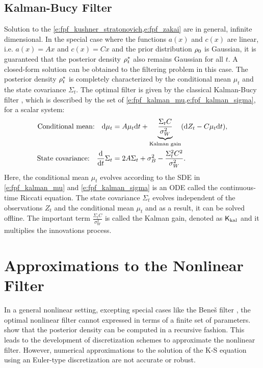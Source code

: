 \subsection{Kalman-Bucy Filter}
Solution to the \cref{e:fpf_kushner_stratonovich,e:fpf_zakai} are in general, infinite dimensional. In the special case where the functions $a(x)$ and $c(x)$ are linear, i.e. $a(x) = Ax$ and $c(x) = Cx$ and the prior distribution $\rho_0$ is Gaussian, it is guaranteed that the posterior density $\rho^*_t$ also remains Gaussian for all $t$. A closed-form solution can be obtained to the filtering problem in this case. The posterior density $\rho^*_t$ is completely characterized by the conditional mean $\mu_t$ and the state covariance $\Sigma_t$. The optimal filter is given by the classical Kalman-Bucy filter \cite{kal64}, which is described by the set of \cref{e:fpf_kalman_mu,e:fpf_kalman_sigma}, for a scalar system:
\begin{align}
\text{Conditional mean:} \quad \ud \mu_t & = A \mu_t \ud t + \underbrace{\frac{\Sigma_t C}{\sigma^2_W}}_{\text{Kalman gain}} ( \ud Z_t - C \mu_t \ud t), 
\label{e:fpf_kalman_mu} \\
\text{State covariance:}  \quad  \frac{\ud}{\ud t} \Sigma_t &= 2 A \Sigma_t + \sigma^2_B - \frac{\Sigma^2_t C^2}{\sigma^2_W}. 
\label{e:fpf_kalman_sigma}
\end{align}
Here, the conditional mean $\mu_t$ evolves according to the SDE in \eqref{e:fpf_kalman_mu} and \eqref{e:fpf_kalman_sigma} is an ODE called the continuous-time Riccati equation. The state covariance $\Sigma_t$ evolves independent of the observations $Z_t$ and the conditional mean $\mu_t$ and as a result, it can be solved offline.  
The important term $\frac{\Sigma_t C}{\sigma^2_W}$ is called the Kalman gain, denoted as $\sf K_{\text{kal}}$ and it multiplies the innovations process. 
\section{Approximations to the Nonlinear Filter}
\label{s:approx_nl_filter}
In a general nonlinear setting, excepting special cases like the Bene\v{s} filter \cite{ben81}, the optimal nonlinear filter cannot expressed in terms of a finite set of parameters.  show that the posterior density can be computed in a recursive fashion. This leads to the development of discretization schemes to approximate the nonlinear filter. However, numerical approximations to the solution of the K-S equation using an Euler-type discretization are not accurate or robust. 

